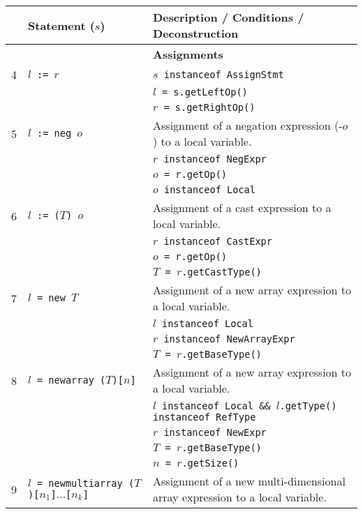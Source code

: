 \documentclass{article}
\begin{document}
\begin{scriptsize}
\begin{tabular}{lll}
\hline
& \textbf{Statement} ($s$)      & \textbf{Description / Conditions / Deconstruction}\\
\hline
\hline
&                & \textbf{Assignments}\\
4 & \texttt{$l$ := $r$}           & \texttt{$s$ instanceof AssignStmt}\\
&                & \texttt{$l$ = s.getLeftOp()}\\
&                & \texttt{$r$ = s.getRightOp()}\\
\hline
5 & \texttt{$l$ := neg $o$}           & Assignment of a negation expression (-$o$) to a local variable.\\
&                & \texttt{$r$ instanceof NegExpr}\\
&                & \texttt{$o$ = r.getOp()}\\
&                & \texttt{$o$ instanceof Local}\\
\hline
6 & \texttt{$l$ := ($T$) $o$}           & Assignment of a cast expression to a local variable.\\
&                & \texttt{$r$ instanceof CastExpr}\\
&                & \texttt{$o$ = r.getOp()}\\
&                & \texttt{$T$ = $r$.getCastType()}\\
\hline
7 & \texttt{$l$ = new $T$}           & Assignment of a new array expression to a local variable.\\
&                & \texttt{$l$ instanceof Local}\\
&                & \texttt{$r$ instanceof NewArrayExpr}\\
&                & \texttt{$T$ = $r$.getBaseType()}\\
\hline
8 & \texttt{$l$ = newarray ($T$)[$n$]}           & Assignment of a new array expression to a local variable.\\
&                & \texttt{$l$ instanceof Local \&\& $l$.getType() instanceof RefType}\\
&                & \texttt{$r$ instanceof NewExpr}\\
&                & \texttt{$T$ = $r$.getBaseType()}\\
&                & \texttt{$n$ = $r$.getSize()}\\
\hline
9 & \texttt{$l$ = newmultiarray ($T$)[$n_1$]$\ldots$[$n_k$]}           & Assignment of a new multi-dimensional array expression to a local variable.\\

\end{tabular}
\end{scriptsize}
\end{document}
